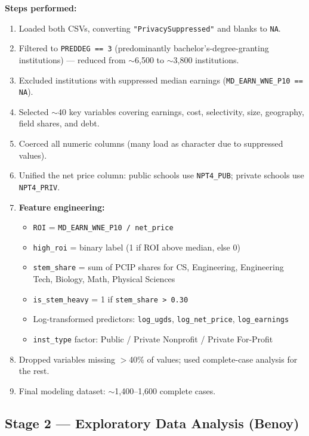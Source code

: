 \documentclass[12pt, letterpaper]{article}
\begin{document}
\textbf{Steps performed:}
\begin{enumerate}
  \item Loaded both CSVs, converting \texttt{"PrivacySuppressed"} and blanks to \texttt{NA}.
  \item Filtered to \texttt{PREDDEG == 3} (predominantly bachelor's-degree-granting institutions) — reduced from $\sim$6,500 to $\sim$3,800 institutions.
  \item Excluded institutions with suppressed median earnings (\texttt{MD\_EARN\_WNE\_P10 == NA}).
  \item Selected $\sim$40 key variables covering earnings, cost, selectivity, size, geography, field shares, and debt.
  \item Coerced all numeric columns (many load as character due to suppressed values).
  \item Unified the net price column: public schools use \texttt{NPT4\_PUB}; private schools use \texttt{NPT4\_PRIV}.
  \item \textbf{Feature engineering:}
    \begin{itemize}
      \item \texttt{ROI} = \texttt{MD\_EARN\_WNE\_P10 / net\_price}
      \item \texttt{high\_roi} = binary label (1 if ROI above median, else 0)
      \item \texttt{stem\_share} = sum of PCIP shares for CS, Engineering, Engineering Tech, Biology, Math, Physical Sciences
      \item \texttt{is\_stem\_heavy} = 1 if \texttt{stem\_share > 0.30}
      \item Log-transformed predictors: \texttt{log\_ugds}, \texttt{log\_net\_price}, \texttt{log\_earnings}
      \item \texttt{inst\_type} factor: Public / Private Nonprofit / Private For-Profit
    \end{itemize}
  \item Dropped variables missing $>$40\% of values; used complete-case analysis for the rest.
  \item Final modeling dataset: $\sim$1,400–1,600 complete cases.
\end{enumerate}

\subsection{Stage 2 — Exploratory Data Analysis (Benoy)}
\end{document}
